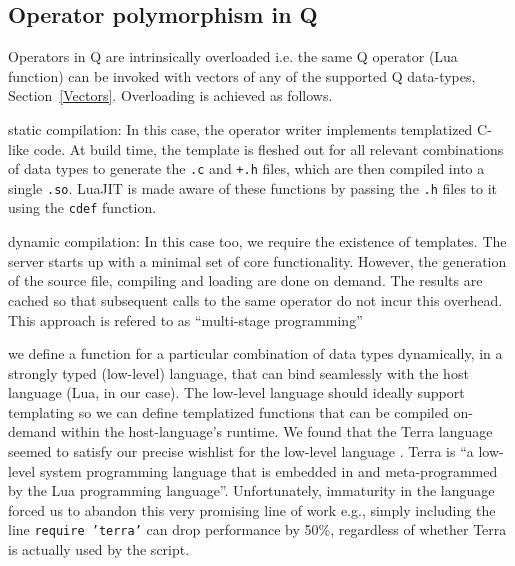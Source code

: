 \subsection{Operator polymorphism in Q}
\label{polymorphism}

Operators in Q are intrinsically overloaded i.e. the same Q operator
(Lua function) can be invoked with vectors of any of the supported Q data-types,
Section~\ref{Vectors}.
Overloading is achieved as follows.
\be
\item static compilation: In this case, the operator writer implements
  templatized C-like code. At build time, the template is fleshed out for all
  relevant combinations of data types to generate the {\tt .c} and {\tt +.h}
  files, which are then compiled into a single {\tt .so}. LuaJIT is made aware
  of these functions by passing the {\tt .h} files to it using 
the {\tt cdef} function.
\item dynamic compilation: 
  In this case too, we require the existence of templates. 
  The server starts up with a minimal set of core functionality. 
  However, the generation of the source file, compiling and loading
  are done on demand. The results are cached
  so that subsequent calls to the same operator do not incur this overhead.
  This approach is refered to as  ``multi-stage programming''
\item we define a function for a particular combination of data types
  dynamically, in a strongly typed (low-level) language, that can bind seamlessly
  with the host language (Lua, in our case). The low-level language should ideally support templating so we can define templatized functions that can be compiled on-demand within the host-language's runtime.
  We found that the Terra language seemed to satisfy our precise wishlist for
  the low-level language \cite{devito2015}.
Terra is ``a low-level system programming language that is embedded in and
meta-programmed by the Lua programming language''. Unfortunately, immaturity in
the language forced us to abandon this very promising line of work e.g., simply
including the line {\tt require 'terra'} can drop performance by 50\%,
regardless of whether Terra is actually used by the script.
\ee

